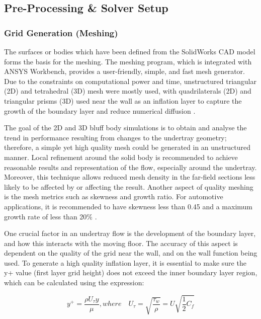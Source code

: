 \subsection{Pre-Processing \& Solver Setup}

\subsubsection{Grid Generation (Meshing)}
\noindent The surfaces or bodies which have been defined from the SolidWorks CAD model forms the basis for the meshing. The meshing program, which is integrated with ANSYS Workbench, provides a user-friendly, simple, and fast mesh generator. Due to the constraints on computational power and time, unstructured triangular (2D) and tetrahedral (3D) mesh were mostly used, with quadrilaterals (2D) and triangular prisms (3D) used near the wall as an inflation layer to capture the growth of the boundary layer and reduce numerical diffusion \cite{Lanfrit2005BestFLUENT}.

\noindent The goal of the 2D and 3D bluff body simulations is to obtain and analyse the trend in performance resulting from changes to the undertray geometry; therefore, a simple yet high quality mesh could be generated in an unstructured manner. Local refinement around the solid body is recommended \cite{Lanfrit2005BestFLUENT} to achieve reasonable results and representation of the flow, especially around the undertray. Moreover, this technique allows reduced mesh density in the far-field sections less likely to be affected by or affecting the result. Another aspect of quality meshing is the mesh metrics such as skewness and growth ratio. For automotive applications, it is recommended to have skewness less than 0.45 and a maximum growth rate of less than 20\% \cite{Lanfrit2005BestFLUENT}. 

\noindent One crucial factor in an undertray flow is the development of the boundary layer, and how this interacts with the moving floor. The accuracy of this aspect is dependent on the quality of the grid near the wall, and on the wall function being used. To generate a high quality inflation layer, it is essential to make sure the y+ value (first layer grid height) does not exceed the inner boundary layer region, which can be calculated using the expression:

\begin{equation}
    y^+ = \frac{\rho U_\tau y}{\mu}, where \quad U_\tau = \sqrt{\frac{\tau_w}{\rho}} = U \sqrt{\frac{1}{2}C_f}
\end{equation}

